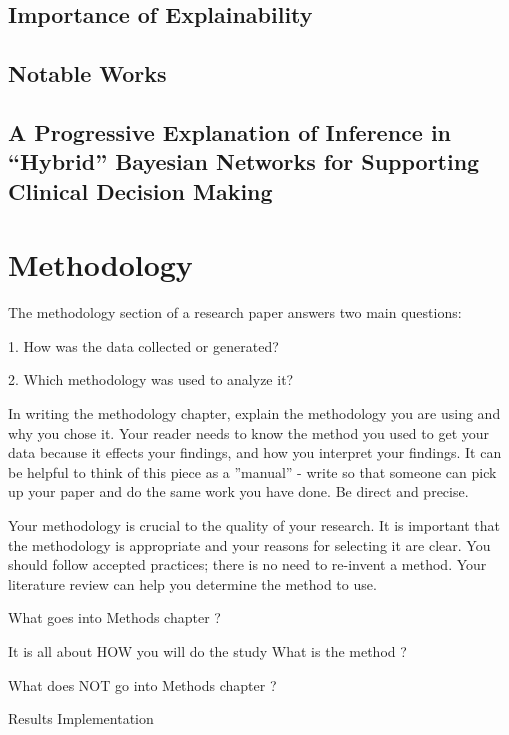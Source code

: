 \documentclass[mscthesis]{usiinfthesis}
\begin{document}
\section{Importance of Explainability}

\section{Notable Works}



\section{A Progressive Explanation of Inference in \enquote{Hybrid} Bayesian Networks for Supporting Clinical Decision Making}


\chapter{Methodology}\label{chap:methodology}
The methodology section of a research paper answers two main questions:

1. How was the data collected or generated?

2. Which methodology was used to analyze it?

In writing the methodology chapter, explain the methodology you are using and why you chose it. Your reader needs to know the method you used to get your data because it effects your findings, and how you interpret your findings. It can be helpful to think of this piece as a ''manual'' - write so that someone can pick up your paper and do the same work you have done. Be direct and precise.

Your methodology is crucial to the quality of your research. It is important that the methodology is appropriate and your reasons for selecting it are clear. You should follow accepted practices; there is no need to re-invent a method. Your literature review can help you determine the method to use.

What  goes  into  Methods  chapter  ?  

It  is  all  about  HOW  you  will  do  the  study   What  is  the  method  ?  

What  does NOT go  into  Methods  chapter  ?  

Results  Implementation
\end{document}
